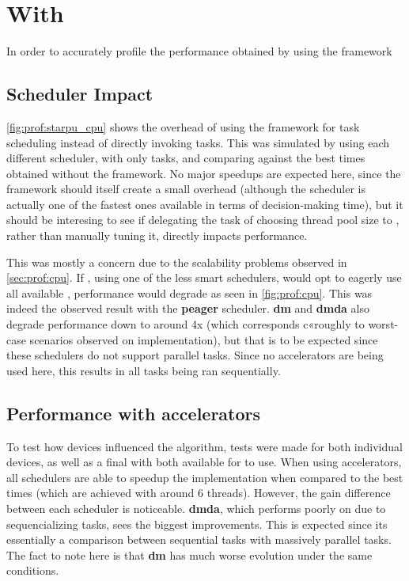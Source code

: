 \documentclass[main.tex]{subfiles}
\begin{document}
\section{With \starpu}

In order to accurately profile the performance obtained by using the framework

\subsection{Scheduler Impact}

\cref{fig:prof:starpu_cpu} shows the overhead of using the framework for task scheduling instead of directly invoking tasks. This was simulated by using each different scheduler, with only \cpu tasks, and comparing against the best \cpu times obtained without the framework. No major speedups are expected here, since the framework should itself create a small overhead (although the scheduler is actually one of the fastest ones available in terms of decision-making time), but it should be interesing to see if delegating the task of choosing \openmp thread pool size to \starpu, rather than manually tuning it, directly impacts performance.

This was mostly a concern due to the scalability problems observed in \cref{sec:prof:cpu}. If \starpu, using one of the less smart schedulers, would opt to eagerly use all available \cpus, performance would degrade as seen in \cref{fig:prof:cpu}. This was indeed the observed result with the \textbf{peager} scheduler. \textbf{dm} and \textbf{dmda} also degrade performance down to around 4x (which corresponds c«roughly to worst-case scenarios observed on \cpu implementation), but that is to be expected since these schedulers do not support parallel tasks. Since no accelerators are being used here, this results in all tasks being ran sequentially.


\subsection{Performance with accelerators}

To test how \cuda devices influenced the algorithm, tests were made for both individual \cuda devices, as well as a final with both \gpus available for \starpu to use.
When using accelerators, all schedulers are able to speedup the implementation when compared to the best \cpu times (which are achieved with around 6 threads). However, the gain difference between each scheduler is noticeable. \textbf{dmda}, which performs poorly on \cpu due to sequencializing tasks, sees the biggest improvements. This is expected since its essentially a comparison between sequential \cpu tasks with massively parallel \cuda tasks. The fact to note here is that \textbf{dm} has much worse evolution under the same conditions.
\end{document}

